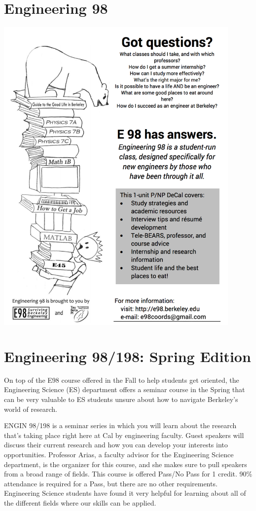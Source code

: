 \chapter*{Engineering 98}

\begin{center}
    \includegraphics[width=0.9\textwidth]{resources/e98-flyer.png}
\end{center}

\newpage
\chapter*{Engineering 98/198: Spring Edition}
On top of the E98 course offered in the Fall to help students get oriented, the Engineering Science (ES) department offers a seminar course in the Spring that can be very valuable to ES students unsure about how to navigate Berkeley's world of research.
 
ENGIN 98/198 is a seminar series in which you will learn about the research that's taking place right here at Cal by engineering faculty. Guest speakers will discuss their current research and how you can develop your interests into opportunities.  Professor Arias, a faculty advisor for the Engineering Science department, is the organizer for this course, and she makes sure to pull speakers from a broad range of fields. This course is offered Pass/No Pass for 1 credit. 90\% attendance is required for a Pass, but there are no other requirements.  Engineering Science students have found it very helpful for learning about all of the different fields where our skills can be applied.
 
